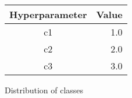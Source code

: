 
\begin{figure}[H]
{\centering
	\begin{tabular}{| c | r |}
		\hline
	
		\textbf{Hyperparameter} & \textbf{Value} \\ \hline
		c1 & 1.0 \\ \hline
		c2 & 2.0 \\ \hline
		c3 & 3.0 \\ \hline
	
	\end{tabular}
	\caption{Distribution of classes}
	\label{fig:enemy-dist}
}
\end{figure}
